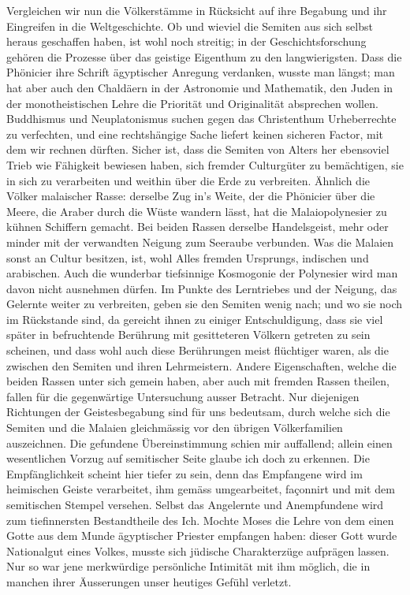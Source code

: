 Vergleichen wir nun die  Völkerstämme in Rücksicht auf ihre Begabung und ihr Eingreifen in die Weltgeschichte. Ob und wieviel die Semiten aus sich selbst heraus geschaffen haben, ist wohl noch streitig; in der Geschichtsforschung gehören die Prozesse über das geistige Eigenthum zu den langwierigsten. Dass die Phönicier ihre Schrift ägyptischer Anregung verdanken, wusste man längst; man hat aber auch den Chaldäern in der Astronomie und Mathematik, den Juden in der monotheistischen Lehre die Priorität und Originalität absprechen wollen. Buddhismus und Neuplatonismus suchen gegen das Christenthum Urheberrechte zu verfechten, und eine rechtshängige Sache liefert keinen sicheren Factor, mit dem wir rechnen dürften. Sicher ist, dass die Semiten von Alters her ebensoviel Trieb wie Fähigkeit bewiesen haben, sich \label{fp.391} fremder Culturgüter zu bemächtigen, sie in sich zu verarbeiten und weithin über die Erde zu verbreiten. Ähnlich die Völker malaischer Rasse: derselbe Zug in’s Weite, der die Phönicier über die Meere, die Araber durch die Wüste wandern lässt, hat die Malaiopolynesier zu kühnen Schiffern gemacht. Bei beiden Rassen derselbe Handelsgeist, mehr oder minder mit der verwandten Neigung zum Seeraube verbunden. Was die Malaien sonst an Cultur besitzen, ist, wohl Alles fremden Ursprungs, indischen und arabischen. Auch die wunderbar tiefsinnige Kosmogonie der Polynesier wird man davon nicht ausnehmen dürfen. Im Punkte des Lerntriebes und der Neigung, das Gelernte weiter zu verbreiten, geben sie den Semiten wenig nach; und wo sie noch im Rückstande sind, da gereicht ihnen zu einiger Entschuldigung, dass sie viel später in befruchtende Berührung mit gesitteteren Völkern getreten zu sein scheinen, und dass wohl auch diese Berührungen meist flüchtiger waren, als die zwischen den Semiten und ihren Lehrmeistern. Andere Eigenschaften, welche die beiden Rassen unter sich gemein haben, aber auch mit fremden Rassen theilen, fallen für die gegenwärtige Untersuchung ausser Betracht. Nur diejenigen Richtungen der Geistesbegabung sind für uns bedeutsam, durch welche sich die Semiten und die Malaien gleichmässig vor den übrigen Völkerfamilien auszeichnen. Die gefundene Übereinstimmung schien mir auffallend; allein einen wesentlichen Vorzug auf semitischer Seite glaube ich doch zu erkennen. Die Empfänglichkeit scheint hier tiefer zu sein, denn das Empfangene wird im heimischen Geiste verarbeitet, ihm gemäss umgearbeitet, façonnirt und mit dem semitischen Stempel versehen. Selbst das Angelernte und Anempfundene wird zum tiefinnersten Bestandtheile des Ich. Mochte Moses die Lehre von dem einen Gotte aus dem Munde ägyptischer Priester empfangen haben: dieser Gott wurde Nationalgut eines Volkes, musste sich jüdische Charakterzüge aufprägen lassen. Nur so war jene merkwürdige persönliche Intimität mit ihm möglich, die in manchen ihrer Äusserungen unser heutiges Gefühl verletzt.

